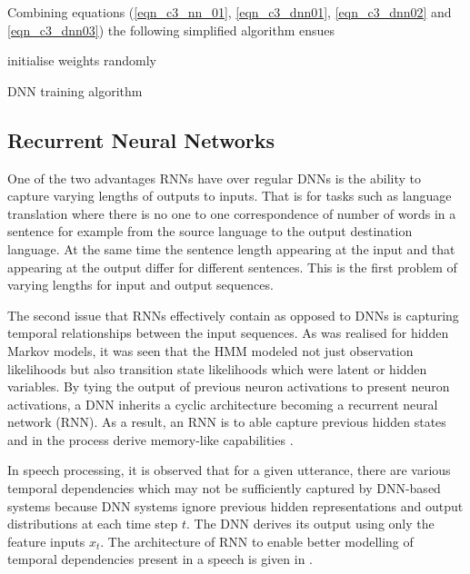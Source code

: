 Combining equations (\ref{eqn_c3_nn_01}, \ref{eqn_c3_dnn01}, \ref{eqn_c3_dnn02} and \ref{eqn_c3_dnn03}) the following simplified algorithm ensues

\begin{algorithm}[H]
\SetAlgoLined
{}
 initialise weights randomly\;
 \caption{DNN training algorithm}
\end{algorithm}

\subsection{Recurrent Neural Networks}
One of the two advantages RNNs have over regular DNNs is the ability to capture varying lengths of outputs to inputs.  That is for tasks such as language translation where there is no one to one correspondence of number of words in a sentence for example from the source language to the output destination language.  At the same time the sentence length appearing at the input and that appearing at the output differ for different sentences.  This is the first problem of varying lengths for input and output sequences.

The second issue that RNNs effectively contain as opposed to DNNs is capturing temporal relationships between the input sequences.  As was realised for hidden Markov models, it was seen that the HMM modeled not just observation likelihoods but also transition state likelihoods which were latent or hidden variables.  By tying the output of previous neuron activations to present neuron activations, a DNN inherits a cyclic architecture becoming a recurrent neural network (RNN). As a result, an RNN is to able capture previous hidden states and in the process derive memory-like capabilities \citep{yu2016automatic}.

In speech processing, it is observed that for a given utterance, there are various temporal dependencies which may not be sufficiently captured by DNN-based systems because DNN systems ignore previous hidden representations and output distributions at each time step $t$.  The DNN derives its output using only the  feature inputs $x_t$. The architecture of RNN to enable better modelling of temporal dependencies present in a speech is given in \citep{hannun2014first, yu2016automatic}. 

